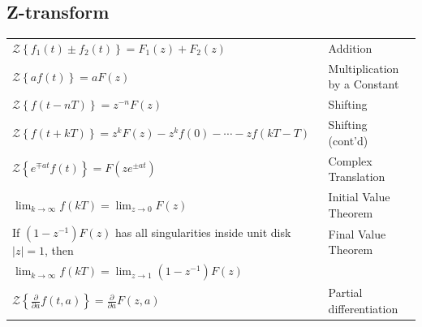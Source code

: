 \begin{multicols}{2}

\subsection{Z-transform}
\begin{tabular}{p{7.75cm} p{4.75cm}}
$\mathcal{Z} \left\{ f_1(t) \pm f_2(t) \right\}=F_1(z)+F_2(z)$ & Addition\\
$\mathcal{Z} \left\{ af(t) \right\}= aF(z)$ & Multiplication by a Constant \\
$\mathcal{Z} \left\{ f(t-nT) \right\}=z^{-n}F(z)$ & Shifting \\
$\mathcal{Z} \left\{ f(t+kT) \right\}=z^{k}F(z)-z^{k}f(0)- \cdots - z f(kT-T)$ & Shifting (cont'd)\\
$\mathcal{Z} \left\{ e^{\mp at} f(t) \right\}=F(ze^{\pm at})$ & Complex Translation \\
$\lim_{k \rightarrow \infty} f(kT)= \lim_{z \rightarrow 0}F(z)$ & Initial Value Theorem \\ \hline
If $(1-z^{-1})F(z)$ has all singularities inside unit disk $|z|=1$, then & Final Value Theorem \\
$\lim_{k \rightarrow \infty} f(kT) = \lim_{z \rightarrow 1} (1-z^{-1})F(z)$ & \\
$\mathcal{Z} \left\{ \frac{\partial}{\partial a} f(t,a) \right\} = \frac{\partial}{\partial a} F(z,a)$& Partial differentiation
\end{tabular}


\end{multicols}
